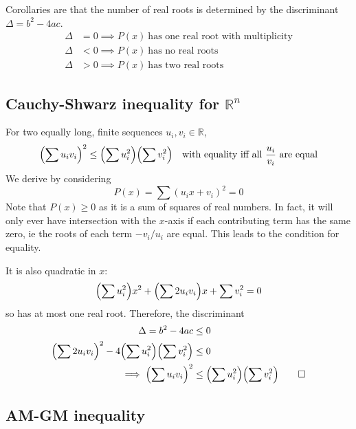 \documentclass[fleqn,a4paper,11pt]{article}
\begin{document}
    Corollaries are that the number of real roots is determined by the
    discriminant \({\Delta = b^2 - 4ac}\).
    \begin{align}
    \Delta &= 0 \implies P(x)\ \text{has one real root with multiplicity} \\
    \Delta &< 0 \implies P(x)\ \text{has no real roots} \\
    \Delta &> 0 \implies P(x)\ \text{has two real roots}
    \end{align}

    \subsection[Cauchy-Shwarz inequality for \(\mathbb R^n\)]
               {Cauchy-Shwarz inequality for \boldmath\(\mathbb R^n\)}

    For two equally long, finite sequences \(u_i, v_i \in \mathbb R\),
    \begin{equation}
    \pqty{\sum u_i v_i}^2 \le \pqty{\sum u_i^2} \pqty{\sum v_i^2}
        \quad \text{with equality iff all \(\frac{u_i}{v_i}\) are equal}
    \end{equation}
    We derive by considering
    \begin{equation*}
    P(x) = \sum (u_i x + v_i)^2 = 0
    \end{equation*}
    Note that \(P(x) \ge 0\) as it is a sum of squares of real numbers. In fact,
    it will only ever have intersection with the \(x\)-axis if each contributing
    term has the same zero, ie the roots of each term \(-v_i/u_i\) are equal.
    This leads to the condition for equality.

    It is also quadratic in \(x\):
    \begin{equation*}
    \pqty{\sum u_i^2} x^2 + \pqty{\sum 2 u_i v_i} x + \sum v_i^2 = 0
    \end{equation*}
    so has at most one real root. Therefore, the discriminant
    \begin{align*}
    \Delta = b^2 - 4ac &\le 0 \\
    \pqty{\sum 2 u_i v_i}^2 - 4\pqty{\sum u_i^2}\pqty{\sum v_i^2} &\le 0
    \\\implies
    \pqty{\sum u_i v_i}^2 &\le \pqty{\sum u_i^2} \pqty{\sum v_i^2} \qed
    \end{align*}

    \subsection{AM-GM inequality}
\end{document}
